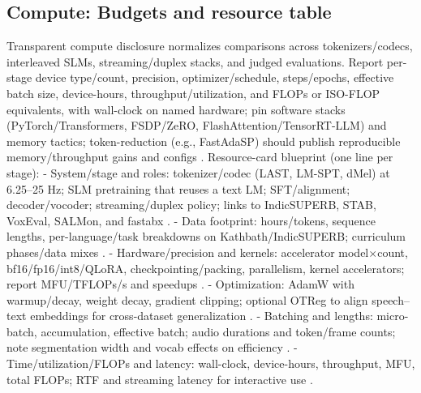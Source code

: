 \documentclass{article}
\begin{document}
\subsection{Compute: Budgets and resource table} \label{subsec:Compute: Budgets and resource table}
Transparent compute disclosure normalizes comparisons across tokenizers/codecs, interleaved SLMs, streaming/duplex stacks, and judged evaluations. Report per-stage device type/count, precision, optimizer/schedule, steps/epochs, effective batch size, device-hours, throughput/utilization, and FLOPs or ISO-FLOP equivalents, with wall-clock on named hardware; pin software stacks (PyTorch/Transformers, FSDP/ZeRO, FlashAttention/TensorRT-LLM) and memory tactics; token-reduction (e.g., FastAdaSP) should publish reproducible memory/throughput gains and configs \cite{maimon2025slammingtrainingspeechlanguagemodelonegp,chen2023reducingbarriersselfsupervisedlearninghu,lu2024fastadaspmultitaskadaptedefficientinfere}. Resource-card blueprint (one line per stage):
- System/stage and roles: tokenizer/codec (LAST, LM-SPT, dMel) at 6.25--25 Hz; SLM pretraining that reuses a text LM; SFT/alignment; decoder/vocoder; streaming/duplex policy; links to IndicSUPERB, STAB, VoxEval, SALMon, and fastabx \cite{turetzky2024lastlanguagemodelawarespeechtokenization,jo2025lmsptalignedsemanticdistillationspeechto,bai2025dmelspeechtokenizationmadesimple,vashishth2024stabspeechtokenizerassessmentbenchmark,cui2025voxevalbenchmarkingknowledgeunderstandin,maimon2025salmonsuiteacousticlanguagemodelevaluati,poli2025fastabxlibraryefficientcomputationabxdis}.
- Data footprint: hours/tokens, sequence lengths, per-language/task breakdowns on Kathbath/IndicSUPERB; curriculum phases/data mixes \cite{entry2025indicsuperbspeechprocessinguniversalperf}.
- Hardware/precision and kernels: accelerator model$\times$count, bf16/fp16/int8/QLoRA, checkpointing/packing, parallelism, kernel accelerators; report MFU/TFLOPs/s and speedups \cite{maimon2025scalinganalysisinterleavedspeechtextlang,lu2024fastadaspmultitaskadaptedefficientinfere}.
- Optimization: AdamW with warmup/decay, weight decay, gradient clipping; optional OTReg to align speech--text embeddings for cross-dataset generalization \cite{xu2025optimaltransportregularizationspeechtext}.
- Batching and lengths: micro-batch, accumulation, effective batch; audio durations and token/frame counts; note segmentation width and vocab effects on efficiency \cite{turetzky2024lastlanguagemodelawarespeechtokenization}.
- Time/utilization/FLOPs and latency: wall-clock, device-hours, throughput, MFU, total FLOPs; RTF and streaming latency for interactive use \cite{maimon2025slammingtrainingspeechlanguagemodelonegp,entry2025indicsuperbspeechprocessinguniversalperf}.
\end{document}
